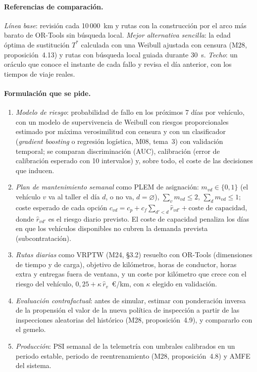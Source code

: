 \paragraph{Referencias de comparación.} \emph{Línea base}: revisión cada 10\,000~km y rutas con la construcción por el arco más barato de OR-Tools sin búsqueda local. \emph{Mejor alternativa sencilla}: la edad óptima de sustitución $T^{\ast}$ calculada con una Weibull ajustada con censura (M28, proposición~4.13) y rutas con búsqueda local guiada durante 30~s. \emph{Techo}: un oráculo que conoce el instante de cada fallo y revisa el día anterior, con los tiempos de viaje reales.

\paragraph{Formulación que se pide.}
\begin{enumerate}[label=F\arabic*.]
  \item \emph{Modelo de riesgo}: probabilidad de fallo en los próximos 7 días por vehículo, con un modelo de supervivencia de Weibull con riesgos proporcionales estimado por máxima verosimilitud con censura y con un clasificador (\emph{gradient boosting} o regresión logística, M08, tema~3) con validación temporal; se comparan discriminación (AUC), calibración (error de calibración esperado con 10 intervalos) y, sobre todo, el coste de las decisiones que inducen.
  \item \emph{Plan de mantenimiento semanal} como PLEM de asignación: $m_{vd}\in\{0,1\}$ (el vehículo $v$ va al taller el día $d$, o no va, $d=\varnothing$), $\sum_vm_{vd}\le 2$, $\sum_dm_{vd}\le 1$; coste esperado de cada opción $c_{vd}=c_p+c_f\sum_{d'<d}\hat r_{vd'}+\text{coste de capacidad}$, donde $\hat r_{vd'}$ es el riesgo diario previsto. El coste de capacidad penaliza los días en que los vehículos disponibles no cubren la demanda prevista (subcontratación).
  \item \emph{Rutas diarias} como VRPTW (M24, §3.2) resuelto con OR-Tools (dimensiones de tiempo y de carga), objetivo de kilómetros, horas de conductor, horas extra y entregas fuera de ventana, y un coste por kilómetro que crece con el riesgo del vehículo, $0{,}25+\kappa\,\hat r_v$~€/km, con $\kappa$ elegido en validación.
  \item \emph{Evaluación contrafactual}: antes de simular, estimar con ponderación inversa de la propensión el valor de la nueva política de inspección a partir de las inspecciones aleatorias del histórico (M28, proposición~4.9), y compararlo con el gemelo.
  \item \emph{Producción}: PSI semanal de la telemetría con umbrales calibrados en un periodo estable, periodo de reentrenamiento (M28, proposición~4.8) y AMFE del sistema.
\end{enumerate}

